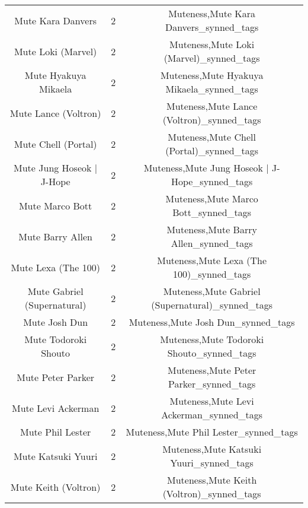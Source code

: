 \begin{table}[h!]
{\begin{tabular}{|c|c|c|}
                                 Mute Kara Danvers &          2 &             Muteness,Mute Kara Danvers\_synned\_tags \\
                                Mute Loki (Marvel) &          2 &            Muteness,Mute Loki (Marvel)\_synned\_tags \\
                              Mute Hyakuya Mikaela &          2 &          Muteness,Mute Hyakuya Mikaela\_synned\_tags \\
                              Mute Lance (Voltron) &          2 &          Muteness,Mute Lance (Voltron)\_synned\_tags \\
                               Mute Chell (Portal) &          2 &           Muteness,Mute Chell (Portal)\_synned\_tags \\
                         Mute Jung Hoseok | J-Hope &          2 &     Muteness,Mute Jung Hoseok | J-Hope\_synned\_tags \\
                                   Mute Marco Bott &          2 &               Muteness,Mute Marco Bott\_synned\_tags \\
                                  Mute Barry Allen &          2 &              Muteness,Mute Barry Allen\_synned\_tags \\
                               Mute Lexa (The 100) &          2 &           Muteness,Mute Lexa (The 100)\_synned\_tags \\
                       Mute Gabriel (Supernatural) &          2 &   Muteness,Mute Gabriel (Supernatural)\_synned\_tags \\
                                     Mute Josh Dun &          2 &                 Muteness,Mute Josh Dun\_synned\_tags \\
                              Mute Todoroki Shouto &          2 &          Muteness,Mute Todoroki Shouto\_synned\_tags \\
                                 Mute Peter Parker &          2 &             Muteness,Mute Peter Parker\_synned\_tags \\
                                Mute Levi Ackerman &          2 &            Muteness,Mute Levi Ackerman\_synned\_tags \\
                                  Mute Phil Lester &          2 &              Muteness,Mute Phil Lester\_synned\_tags \\
                                Mute Katsuki Yuuri &          2 &            Muteness,Mute Katsuki Yuuri\_synned\_tags \\
                              Mute Keith (Voltron) &          2 &          Muteness,Mute Keith (Voltron)\_synned\_tags \\

\end{tabular}}
\end{table}
